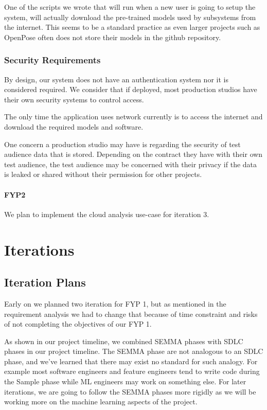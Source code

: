 \documentclass[12pt,a4paper,man]{report}
\begin{document}
One of the scripts we wrote that will run when a new user is going to setup the system, will actually download the pre-trained models used by subsystems from the internet. This seems to be a standard practice as even larger projects such as OpenPose often does not store their models in the github repository. 

\section{Security Requirements}
\label{sec:org4b8abc5}
By design, our system does not have an authentication system nor it is considered required. We consider that if deployed, most production studios have their own security systems to control access.

The only time the application uses network currently is to access the internet and download the required models and software.

One concern a production studio may have is regarding the security of test audience data that is stored. Depending on the contract they have with their own test audience, the test audience may be concerned with their privacy if the data is leaked or shared without their permission for other projects.


\subsection{FYP2}
\label{sec:org0cf48eb}
We plan to implement the cloud analysis use-case for iteration 3.

\part{Iterations}
\label{sec:org767cdf5}
\chapter{Iteration Plans}
\label{sec:org01c1e19}
Early on we planned two iteration for FYP 1, but as mentioned in the requirement analysis we had to change that because of time constraint and risks of not completing the objectives of our FYP 1. 

As shown in our project timeline, we combined SEMMA phases with SDLC phases in our project timeline. The SEMMA phase are not analogous to an SDLC phase, and we've learned that there may exist no standard for such analogy. For example most software engineers and feature engineers tend to write code during the Sample phase while ML engineers may work on something else. For later iterations, we are going to follow the SEMMA phases more rigidly as we will be working more on the machine learning aspects of the project.
\end{document}
